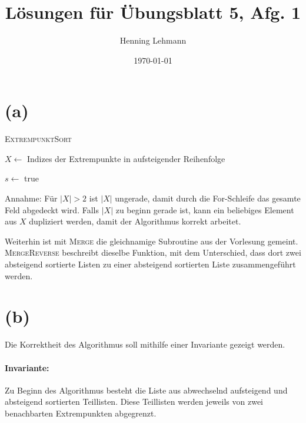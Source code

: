 \documentclass[a4paper,12pt]{article}
\title{Lösungen für Übungsblatt 5, Afg. 1}
\author{Henning Lehmann}
\date{\today}
\begin{document}

\section*{(a)}

\begin{algorithm}
\caption{\textsc{ExtrempunktSort}}

$X \gets$ Indizes der Extrempunkte in aufsteigender Reihenfolge


$s \gets$ true

\;

\end{algorithm}
Annahme: Für $|X| > 2$ ist $|X|$ ungerade, damit durch die For-Schleife das gesamte Feld abgedeckt wird. Falls $|X|$ zu beginn gerade ist, kann ein beliebiges Element aus $X$ dupliziert werden, damit der Algorithmus korrekt arbeitet.

Weiterhin ist mit \textsc{Merge} die gleichnamige Subroutine aus der Vorlesung gemeint. \textsc{MergeReverse} beschreibt dieselbe Funktion, mit dem Unterschied, dass dort zwei absteigend sortierte Listen zu einer absteigend sortierten Liste zusammengeführt werden.

\section*{(b)}
Die Korrektheit des Algorithmus soll mithilfe einer Invariante gezeigt werden.

\paragraph{Invariante: } Zu Beginn des Algorithmus besteht die Liste aus abwechselnd aufsteigend und absteigend sortierten Teillisten. Diese Teillisten werden jeweils von zwei benachbarten Extrempunkten abgegrenzt.\\
\end{document}
